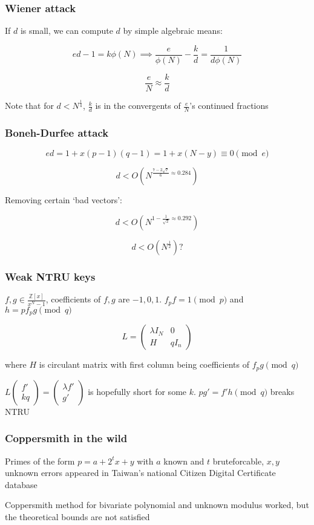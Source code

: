 \documentclass{beamer}
\begin{document}
\begin{frame}
    \frametitle{Wiener attack}
    If $d$ is small, we can compute $d$ by simple algebraic means:

    $$ed-1=k\phi(N)\implies\frac{e}{\phi(N)}-\frac kd=\frac1{d\phi(N)}$$\pause

    $$\frac eN\approx\frac kd$$

    Note that for $d<N^{\frac14}$, $\frac kd$ is in the convergents of $\frac eN$'s continued fractions
\end{frame}

\begin{frame}
    \frametitle{Boneh-Durfee attack}
    $$ed=1+x(p-1)(q-1)=1+x(N-y)\equiv0\pmod e$$

    $$d<O\left(N^{\frac{7-2\sqrt7}6\approx0.284}\right)$$\pause

    Removing certain `bad vectors':
    
    $$d<O\left(N^{1-\frac1{\sqrt2}\approx0.292}\right)$$\pause
    
    $$d<O\left(N^{\frac12}\right)?$$
\end{frame}

\begin{frame}
    \frametitle{Weak NTRU keys}
    $f,g\in\frac{\mathbb Z[x]}{x^N-1}$, coefficients of $f,g$ are $-1,0,1$. $f_pf=1\pmod p$ and $h=pf_pg\pmod q$\pause

    $$L=\begin{pmatrix}
        \lambda I_N&0\\
        H&qI_n
    \end{pmatrix}$$
    
    where $H$ is circulant matrix with first column being coefficients of $f_pg\pmod q$

    $L\begin{pmatrix}f'\\kq\end{pmatrix}=\begin{pmatrix}\lambda f'\\g'\end{pmatrix}$ is hopefully short for some $k$. $pg'=f'h\pmod q$ breaks NTRU
\end{frame}

\begin{frame}
    \frametitle{Coppersmith in the wild}
    Primes of the form $p=a+2^tx+y$ with $a$ known and $t$ bruteforcable, $x,y$ unknown errors appeared in Taiwan's national Citizen Digital Certificate database\pause

    Coppersmith method for bivariate polynomial and unknown modulus worked, but the theoretical bounds are not satisfied
\end{frame}
\end{document}
